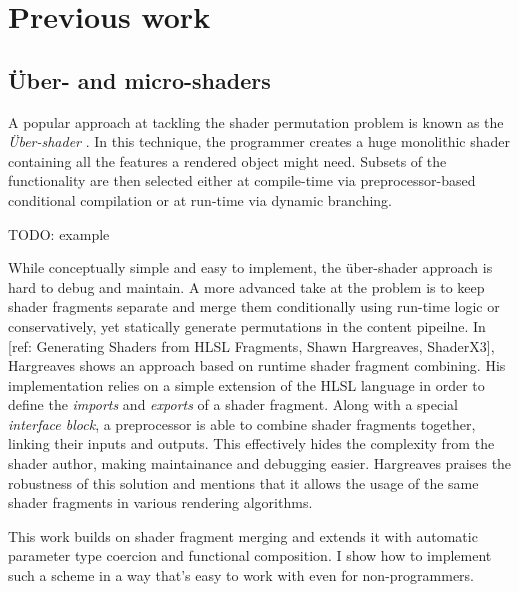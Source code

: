 
\chapter{ Previous work }
\label{Chapter3}

\section{Über- and micro-shaders}

A popular approach at tackling the shader permutation problem is known as the \emph{ Über-shader }. In this technique, the programmer creates a huge monolithic shader containing all the features a rendered object might need. Subsets of the functionality are then selected either at compile-time via preprocessor-based conditional compilation or at run-time via dynamic branching.

TODO: example

While conceptually simple and easy to implement, the über-shader approach is hard to debug and maintain. A more advanced take at the problem is to keep shader fragments separate and merge them conditionally using run-time logic or conservatively, yet statically generate permutations in the content pipeilne. In [ref: Generating Shaders from HLSL Fragments, Shawn Hargreaves, ShaderX3], Hargreaves shows an approach based on runtime shader fragment combining. His implementation relies on a simple extension of the HLSL language in order to define the \emph{imports} and \emph{exports} of a shader fragment. Along with a special \emph{interface block}, a preprocessor is able to combine shader fragments together, linking their inputs and outputs. This effectively hides the complexity from the shader author, making maintainance and debugging easier. Hargreaves praises the robustness of this solution and mentions that it allows the usage of the same shader fragments in various rendering algorithms.

This work builds on shader fragment merging and extends it with automatic parameter type coercion and functional composition. I show how to implement such a scheme in a way that's easy to work with even for non-programmers.


